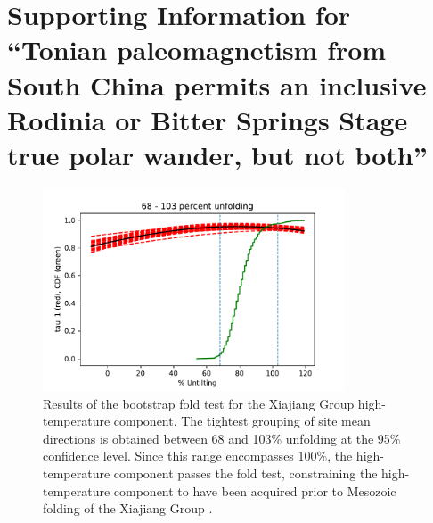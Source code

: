 \chapter[Supporting Information for ``Tonian paleomagnetism from South China permits an inclusive Rodinia or Bitter Springs Stage true polar wander, but not both''][Supporting Information - Xiajiang Group]{Supporting Information for ``Tonian paleomagnetism from South China permits an inclusive Rodinia or Bitter Springs Stage true polar wander, but not both''}

\begin{figure}[h!]
    \centering
    \includegraphics[width=0.8\textwidth]{figures/Xiajiang/bootstrap-CDF.pdf}
    \caption[Results of the bootstrap fold test for the Xiajiang Group high-temperature component.]{Results of the bootstrap fold test \citep{Tauxe1994a} for the Xiajiang Group high-temperature component. The tightest grouping of site mean directions is obtained between 68 and 103\% unfolding at the 95\% confidence level. Since this range encompasses 100\%, the high-temperature component passes the fold test, constraining the high-temperature component to have been acquired prior to Mesozoic folding of the Xiajiang Group \citep{Li2016c, Ma2019a}.}
    \label{fig:bootstrap-CDF}
\end{figure}

